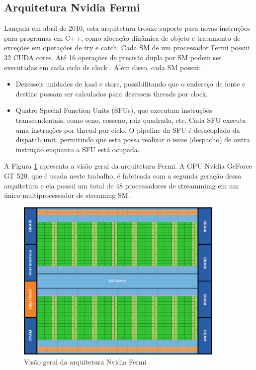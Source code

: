 \subsection{Arquitetura Nvidia Fermi}
Lançada em abril de 2010, esta arquitetura trouxe suporte para novas instruções para programas em C++, como alocação  dinâmica de objeto e tratamento de exceções em operações de try e catch. Cada SM de um processador Fermi possui 32 CUDA cores. Até 16 operações  de precisão dupla por SM podem ser executadas em cada ciclo de clock \cite{NvidiaFermi}.
Além disso, cada SM possui:
\begin{itemize}
\item  Dezesseis unidades de load e store, possibilitando que o endereço de fonte e destino possam ser calculados
para dezesseis threads por clock. \\
\item Quatro Special Function Units (SFUs), que executam instruções  transcendentais, como seno, cosseno, raiz
quadrada, etc. Cada SFU executa uma instruções  por thread por ciclo. O pipeline da SFU é desacoplado
da dispatch unit, permitindo que esta possa realizar o issue (despacho) de outra instrução enquanto a SFU
está ocupada.
\end{itemize}
A Figura \ref{fig:fermi} apresenta a visão geral da arquitetura Fermi. A GPU Nvidia GeForce GT 520, que é usada neste trabalho, é fabricada com a segunda geração dessa arquitetura e ela possui um total de 48 processadores de streammimg em um único multiprocessador de streaming SM.  
\begin{figure}[!ht]
\centering
\includegraphics[width=10cm]{fermi_2.png}
\caption{Visão geral da arquitetura Nvidia Fermi}
\label{fig:fermi}
\end{figure}
\FloatBarrier
